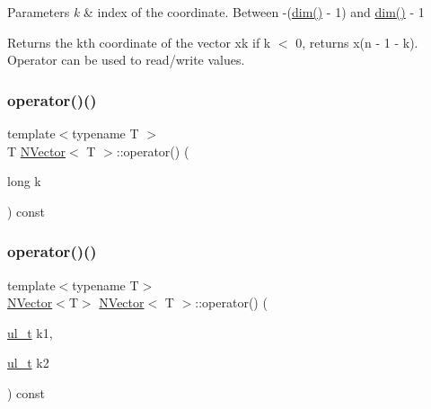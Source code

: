 \begin{DoxyParams}{Parameters}
{\em k} & index of the coordinate. Between -\/(\mbox{\hyperlink{class_n_vector_a7589027db20509ac4d93490bb9a1979a}{dim()}} -\/ 1) and \mbox{\hyperlink{class_n_vector_a7589027db20509ac4d93490bb9a1979a}{dim()}} -\/ 1 \\
\hline
\end{DoxyParams}
\begin{DoxyReturn}{Returns}
the kth coordinate of the vector xk if k $<$ 0, returns x(n -\/ 1 -\/ k). Operator can be used to read/write values. 
\end{DoxyReturn}
\mbox{\label{class_n_vector_a51d4a2c505c1434f45e8f80d1d77eda5}} 
\subsubsection{\texorpdfstring{operator()()}{operator()()}\hspace{0.1cm}{\footnotesize\ttfamily [2/4]}}
{\footnotesize\ttfamily template$<$typename T $>$ \\
T \mbox{\hyperlink{class_n_vector}{N\+Vector}}$<$ T $>$\+::operator() (\begin{DoxyParamCaption}\item[{long}]{k }\end{DoxyParamCaption}) const}

\mbox{\label{class_n_vector_a8778fdc3c0a27a7930fda3f2a7155e96}} 
\subsubsection{\texorpdfstring{operator()()}{operator()()}\hspace{0.1cm}{\footnotesize\ttfamily [3/4]}}
{\footnotesize\ttfamily template$<$typename T$>$ \\
\mbox{\hyperlink{class_n_vector}{N\+Vector}}$<$T$>$ \mbox{\hyperlink{class_n_vector}{N\+Vector}}$<$ T $>$\+::operator() (\begin{DoxyParamCaption}\item[{\mbox{\hyperlink{typedef_8h_a1b140a2034db3f5dfe18a987745df43a}{ul\+\_\+t}}}]{k1,  }\item[{\mbox{\hyperlink{typedef_8h_a1b140a2034db3f5dfe18a987745df43a}{ul\+\_\+t}}}]{k2 }\end{DoxyParamCaption}) const\hspace{0.3cm}{\ttfamily [inline]}}


